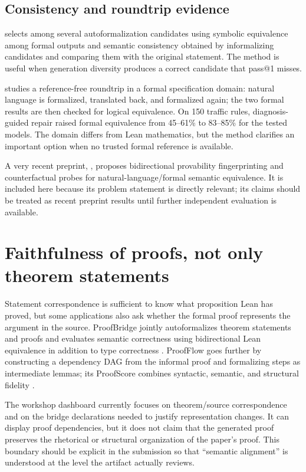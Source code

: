 \documentclass[11pt]{article}
\begin{document}
\subsection{Consistency and roundtrip evidence}

\citet{li2024symbolic} selects among several autoformalization candidates using
symbolic equivalence among formal outputs and semantic consistency obtained by
informalizing candidates and comparing them with the original statement.  The
method is useful when generation diversity produces a correct candidate that
pass@1 misses.

\citet{amrollahi2026roundtrip} studies a reference-free roundtrip in a formal
specification domain: natural language is formalized, translated back, and
formalized again; the two formal results are then checked for logical
equivalence.  On 150 traffic rules, diagnosis-guided repair raised formal
equivalence from 45--61\% to 83--85\% for the tested models.  The domain differs
from Lean mathematics, but the method clarifies an important option when no
trusted formal reference is available.

A very recent preprint, \citet{mohammad2026faithfulnessgap}, proposes
bidirectional provability fingerprinting and counterfactual probes for
natural-language/formal semantic equivalence.  It is included here because its
problem statement is directly relevant; its claims should be treated as recent
preprint results until further independent evaluation is available.

\section{Faithfulness of proofs, not only theorem statements}

Statement correspondence is sufficient to know what proposition Lean has
proved, but some applications also ask whether the formal proof represents the
argument in the source.  ProofBridge jointly autoformalizes theorem statements
and proofs and evaluates semantic correctness using bidirectional Lean
equivalence in addition to type correctness \citep{jana2026proofbridge}.
ProofFlow goes further by constructing a dependency DAG from the informal proof
and formalizing steps as intermediate lemmas; its ProofScore combines syntactic,
semantic, and structural fidelity \citep{cabral2026proofflow}.

The workshop dashboard currently focuses on theorem/source correspondence and
on the bridge declarations needed to justify representation changes.  It can
display proof dependencies, but it does not claim that the generated proof
preserves the rhetorical or structural organization of the paper's proof.  This
boundary should be explicit in the submission so that ``semantic alignment'' is
understood at the level the artifact actually reviews.
\end{document}
